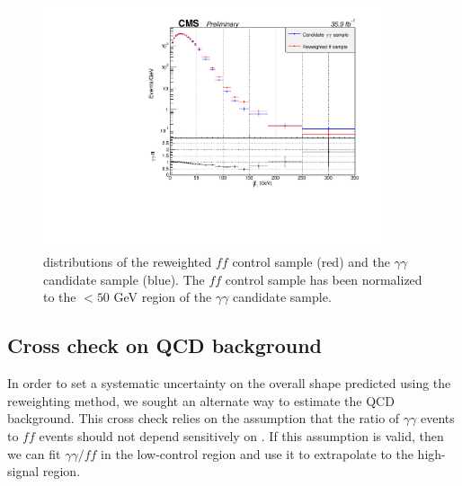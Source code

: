 \begin{figure}[h]
\begin{center}
\includegraphics[width=0.9\textwidth]{Figures/DataAnalysis/ggffReweighted.pdf}
\end{center}
\caption[\ETmiss distributions of the \diempt reweighted $ff$ control sample and the $\gamma\gamma$ candidate sample.]
{\ETmiss distributions of the \diempt reweighted $ff$ control sample (red) and the $\gamma\gamma$ candidate sample (blue). The $ff$ control sample has been normalized to the \ETmiss $ < 50$ GeV region of the $\gamma\gamma$ candidate sample. }
\label{fig:ggffReweighted}
\end{figure}


\subsection{Cross check on QCD background}
\label{sec:crossCheck}

In order to set a systematic uncertainty on the overall \ETmiss shape predicted using the \diempt reweighting method, we sought an alternate way to estimate the QCD background. This cross check relies on the assumption that the ratio of $\gamma\gamma$ events to $ff$ events should not depend sensitively on \ETmiss. If this assumption is valid, then we can fit $\gamma\gamma/ff$ in the low-\ETmiss control region and use it to extrapolate to the high-\ETmiss signal region.

